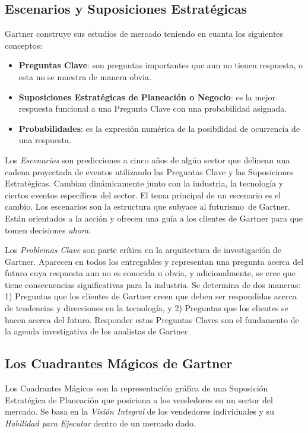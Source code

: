 \documentclass[11pt,letterpaper]{article}
\begin{document}
	\subsection{Escenarios y Suposiciones Estratégicas}
	Gartner construye sus estudios de mercado teniendo en cuanta los siguientes conceptos:
	\begin{itemize}
	\item {\bf Preguntas Clave}: son preguntas importantes que aun no tienen respuesta, o esta no se muestra de manera obvia.
	\item {\bf Suposiciones Estratégicas de Planeación o Negocio}: es la mejor respuesta funcional a una Pregunta Clave con una probabilidad asignada.
	\item {\bf Probabilidades}: es la expresión numérica de la posibilidad de ocurrencia de una respuesta.
	\end{itemize}
	\par Los {\em Escenarios} son predicciones a cinco años de algún sector que delinean una cadena proyectada de eventos utilizando las Preguntas Clave y las Suposiciones Estratégicas. Cambian dinámicamente junto con la industria, la tecnología y ciertos eventos específicos del sector. El tema principal de un escenario es el cambio. Los escenarios son la estructura que subyace al \guillemotleft futurismo\guillemotright\ de Gartner. Están orientados a la acción y ofrecen una guía a los clientes de Gartner para que tomen decisiones {\em ahora}.
	\par Los {\em Problemas Clave} son parte crítica en la arquitectura de investigación de Gartner. Aparecen en todos los entregables y representan una pregunta acerca del futuro cuya respuesta aun no es conocida u obvia, y adicionalmente, se cree que tiene consecuencias significativas para la industria. Se determina de dos maneras: 1) Preguntas que los clientes de Gartner creen que deben ser respondidas acerca de tendencias y direcciones en la tecnología, y 2) Preguntas que los clientes se hacen acerca del futuro. Responder estas Preguntas Claves son el fundamento de la agenda investigativa de los analistas de Gartner.
	
	\subsection{Los Cuadrantes Mágicos de Gartner}
	Los Cuadrantes Mágicos son la representación gráfica de una Suposición Estratégica de Planeación que posiciona a los vendedores en un sector del mercado. Se basa en la {\em Visión Integral} de los vendedores individuales y su {\em Habilidad para Ejecutar} dentro de un mercado dado.
\end{document}
